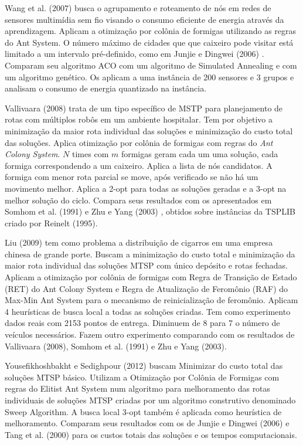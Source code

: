 Wang et al. (2007) \cite{wang2007hierarchical} busca o agrupamento e roteamento de nós em redes de sensores multimídia sem fio visando o consumo eficiente de energia através da aprendizagem. Aplicam a otimização por colônia de formigas utilizando as regras do Ant System. O número máximo de cidades que que caixeiro pode visitar está limitado a um intervalo pré-definido, como em Junjie e Dingwei (2006) \cite{junjie2006}. Comparam seu algoritmo ACO com um algoritmo de Simulated Annealing e com um algoritmo genético. Os aplicam a uma instância de 200 sensores e 3 grupos e analisam o consumo de energia quantizado na instância.

Vallivaara (2008) \cite{vallivaara2008team} trata de um tipo específico de MSTP para planejamento de rotas com múltiplos robôs em um ambiente hospitalar. Tem por objetivo a minimização da maior rota individual das soluções e minimização do custo total das soluções. Aplica otimização por colônia de formigas com regras do \textit{Ant Colony System}. $N$ times com $m$ formigas geram cada um uma solução, cada formiga correspondendo a um caixeiro. Aplica a lista de nós candidatos. A formiga com menor rota parcial se move, após verificado se não há um movimento melhor. Aplica a 2-opt para todas as soluções geradas e a 3-opt na melhor solução do ciclo. Compara seus resultados com os apresentados em Somhom et al. (1991) e Zhu e Yang (2003) \cite{zhu2003}, obtidos sobre instâncias da TSPLIB criado por Reinelt (1995).

Liu (2009) tem como problema a distribuição de cigarros em uma empresa chinesa de grande porte. Buscam a minimização do custo total e minimização da maior rota individual das soluções MTSP com único depósito e rotas fechadas. Aplicam a otimização por colônia de formigas com Regra de Transição de Estado (RET) do Ant Colony System e Regra de Atualização de Feromônio (RAF) do Max-Min Ant System para o mecanismo de reinicialização de feromônio. Aplicam 4 heurísticas de busca local a todas as soluções criadas. Tem como experimento dados reais com 2153 pontos de entrega. Diminuem de 8 para 7 o número de veículos necessários. Fazem outro experimento comparando com os resultados de Vallivaara (2008),  Somhom et al. (1991) e  Zhu e Yang (2003).

Yousefikhoshbakht e Sedighpour (2012) \cite{yousefikhoshbakht2012} buscam Minimizar do custo total das soluções MTSP básico. Utilizam a Otimização por Colônia de Formigas com regras do Elitist Ant System num algoritmo para melhoramento das rotas individuais de soluções MTSP criadas por um algoritmo construtivo denominado Sweep Algorithm. A busca local 3-opt também é aplicada como heurística de melhoramento. Comparam seus resultados com os de Junjie e Dingwei (2006) e Tang et al. (2000) para os custos totais das soluções e os tempos computacionais.

